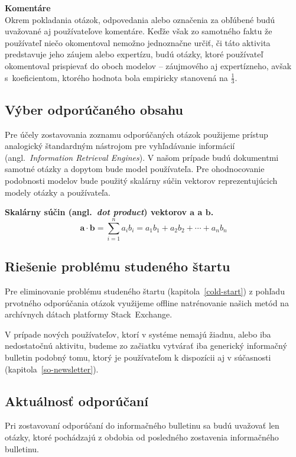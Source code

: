 \textbf{Komentáre}\\
Okrem pokladania otázok, odpovedania alebo označenia za obľúbené budú uvažované aj používateľove komentáre. Keďže však
zo samotného faktu že používateľ niečo okomentoval nemožno jednoznačne určiť, či táto aktivita predstavuje jeho záujem
alebo expertízu, budú otázky, ktoré používateľ okomentoval prispievať do oboch modelov -- záujmového aj expertízneho, avšak
s~koeficientom, ktorého hodnota bola empiricky stanovená na $\frac{1}{3}$.

\subsection{Výber odporúčaného obsahu}\label{design:rec-retrieval}

Pre účely zostavovania zoznamu odporúčaných otázok použijeme prístup analogický štandardným nástrojom pre vyhľadávanie
informácií (angl.~\emph{Information Retrieval Engines}). V našom prípade budú dokumentmi samotné otázky a dopytom bude
model používateľa. Pre ohodnocovanie podobnosti modelov bude použitý skalárny súčin vektorov reprezentujúcich
modely otázky a používateľa.

\textbf{Skalárny súčin (angl.~\textit{dot product}) vektorov $\mathbf{a}$ a $\mathbf{b}$.}\\
$$\mathbf{a}\cdot\mathbf{b}=\sum_{i=1}^n a_ib_i=a_1b_1+a_2b_2+\cdots+a_nb_n$$

\subsection{Riešenie problému studeného štartu}

Pre eliminovanie problému studeného štartu (kapitola~\ref{cold-start}) z pohľadu prvotného odporúčania otázok využijeme
offline natrénovanie našich metód na archívnych dátach platformy Stack~Exchange.

V prípade nových používateľov, ktorí v systéme nemajú žiadnu, alebo iba nedostatočnú aktivitu, budeme zo začiatku vytvárať
iba generický informačný bulletin podobný tomu, ktorý je používateľom k dispozícii aj v súčasnosti (kapitola~\ref{so-newsletter}).


\subsection{Aktuálnosť odporúčaní}

Pri zostavovaní odporúčaní do informačného bulletinu sa budú uvažovať len otázky, ktoré pochádzajú
z obdobia od posledného zostavenia informačného bulletinu.

